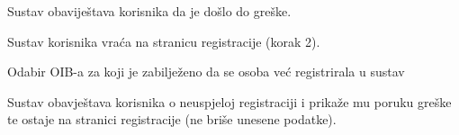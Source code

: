 \begin{packed_item}
\begin{packed_item}
\begin{packed_enum}
								\item Sustav obaviještava korisnika da je došlo do greške.
								\item Sustav korisnika vraća na stranicu registracije (korak 2).
							\end{packed_enum}
							
							\item[5.a] Odabir OIB-a za koji je zabilježeno da se osoba već registrirala u sustav
							\item[] \begin{packed_enum}
								
								\item Sustav obavještava korisnika o neuspjeloj registraciji i prikaže mu poruku greške te ostaje na stranici registracije (ne briše unesene podatke).
								
								
							\end{packed_enum}
							
							
						\end{packed_item}
					\end{packed_item}
					
